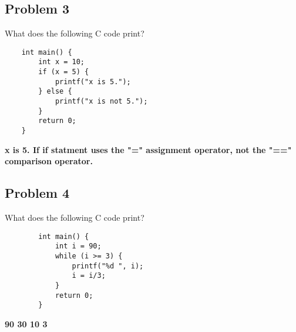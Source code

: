 \documentclass{article}
\begin{document}
\subsection*{Problem 3}
    What does the following C code print?

    \begin{verbatim}
    int main() {
        int x = 10;
        if (x = 5) {
            printf("x is 5.");
        } else {
            printf("x is not 5.");
        }
        return 0;
    }
    \end{verbatim}

    \textbf{x is 5. If if statment uses the "=" assignment operator, not the "==" comparison operator.}

\subsection*{Problem 4}
    What does the following C code print?
    
    \begin{verbatim}
        int main() {
            int i = 90;
            while (i >= 3) {
                printf("%d ", i);
                i = i/3;
            }
            return 0;
        }
    \end{verbatim}

    \textbf{90 30 10 3}




\end{document}
